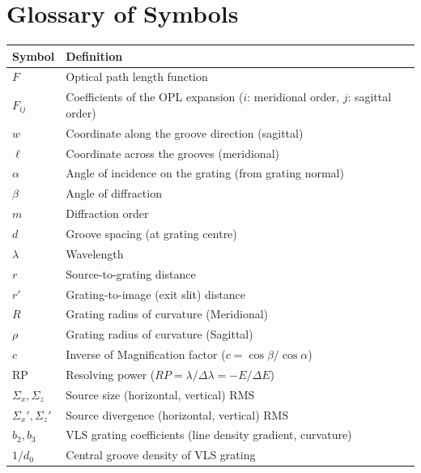 \documentclass[12pt,a4paper]{article}
\newcommand{\al}{\alpha}
\newcommand{\be}{\beta}
\newcommand{\la}{\lambda}
\newcommand{\RP}{\mathrm{RP}}
\begin{document}
\section*{Glossary of Symbols}

\begin{tabular}{lp{10cm}}
\toprule
\textbf{Symbol} & \textbf{Definition} \\
\midrule
$F$                    & Optical path length function \\
$F_{ij}$               & Coefficients of the OPL expansion ($i$: meridional order,
                          $j$: sagittal order) \\
$w$                    & Coordinate along the groove direction (sagittal) \\
$\ell$                 & Coordinate across the grooves (meridional) \\
$\al$                  & Angle of incidence on the grating (from grating normal) \\
$\be$                  & Angle of diffraction \\
$m$                    & Diffraction order \\
$d$                    & Groove spacing (at grating centre) \\
$\la$                  & Wavelength \\
$r$                    & Source-to-grating distance \\
$r'$                   & Grating-to-image (exit slit) distance \\
$R$                    & Grating radius of curvature (Meridional) \\
$\rho$                    & Grating radius of curvature (Sagittal) \\
$c$                    & Inverse of Magnification factor ($c= \cos\be/\cos\al$) \\
$\RP$                  & Resolving power ($RP= \la/\Delta\la=-E/\Delta E$) \\
$\Sigma_x, \Sigma_z$             & Source size (horizontal, vertical) RMS \\
$\Sigma_x', \Sigma_z'$           & Source divergence (horizontal, vertical) RMS \\
$b_2, b_3$             & VLS grating coefficients (line density gradient, curvature) \\
$1/d_0$             & Central groove density of VLS grating \\
\bottomrule
\end{tabular}
\end{document}
